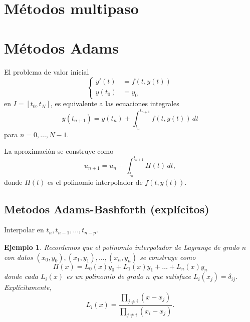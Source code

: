 \documentclass[11pt,letterpaper]{article}
\newtheorem{example}{Ejemplo}
\begin{document}
\section{Métodos multipaso}

\section{Métodos Adams}

El problema de valor inicial
\begin{equation}
  \left\{
    \begin{aligned}
      y'(t) &= f(t,y(t)) \\
      y(t_0) &= y_0
    \end{aligned}
  \right.
\end{equation}
en $I=[t_0,t_N]$, es equivalente a las ecuaciones integrales
\begin{equation}
  y(t_{n+1}) = y(t_n) + \int_{t_n}^{t_{n+1}}\! f(t,y(t))\,dt
\end{equation}
para $n=0,\dots,N-1$.

La aproximación se construye como
\begin{equation}
  u_{n+1} = u_n + \int_{t_n}^{t_{n+1}}\Pi(t)\,dt,
\end{equation}
donde $\Pi(t)$ es el polinomio interpolador de $f(t,y(t))$.


\subsection{Metodos Adams-Bashforth (explícitos)}
Interpolar en $t_{n},t_{n-1},\dots,t_{n-p}$.

\begin{example}
  Recordemos que el polinomio interpolador de Lagrange de grado $n$ 
  con datos $(x_0,y_0),(x_1,y_1),\dots,(x_n,y_n)$ se construye como
  \begin{equation}
    \Pi(x) =  L_0(x)y_0 + L_1(x)y_1 + \dots + L_n(x)y_n
  \end{equation}
  donde cada $L_i(x)$ es un polinomio de grado $n$ que satisface
  $L_i(x_j)=\delta_{ij}$. Explícitamente,
  \begin{equation}
    L_i(x) = \frac{\prod_{j\neq i}(x-x_j)}{\prod_{j\neq i}(x_i-x_j)}
  .\end{equation}
\end{example}
\end{document}
